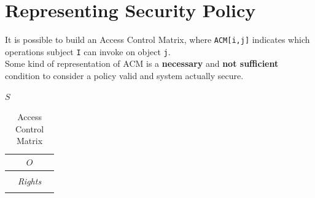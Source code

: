 \section{Representing Security Policy}
It is possible to build an Access Control Matrix, where \lstinline|ACM[i,j]| indicates which operations subject \lstinline{I} can invoke on object \lstinline{j}.\\
Some kind of representation of ACM is a \textbf{necessary} and \textbf{not sufficient} condition to consider a policy valid and system actually secure. 
\begin{table}[h]
    \centering
    $S$
    \begin{tabular}{|c|c|c|}
        \multicolumn{3}{c}{$O$}\\
        \hline
         & &\\
         \hline
         & \textit{Rights} &\\
         \hline
         & & \\
         \hline
    \end{tabular}
    \caption{Access Control Matrix}
    \label{tab:ACM}
\end{table}